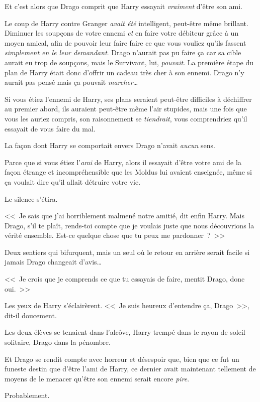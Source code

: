 Et c'est alors que Drago comprit que Harry essayait \emph{vraiment} d'être son ami.

Le coup de Harry contre Granger \emph{avait été} intelligent, peut-être même brillant. Diminuer les soupçons de votre ennemi \emph{et} en faire votre débiteur grâce à un moyen amical, afin de pouvoir leur faire faire ce que vous vouliez qu'ils fassent \emph{simplement en le leur demandant}. Drago n'aurait pas pu faire ça car sa cible aurait eu trop de soupçons, mais le Survivant, lui, \emph{pouvait}. La première étape du plan de Harry était donc d'offrir un cadeau très cher à son ennemi. Drago n'y aurait pas pensé mais ça pouvait \emph{marcher}…

Si vous étiez l'ennemi de Harry, ses plans seraient peut-être difficiles à déchiffrer au premier abord, ils auraient peut-être même l'air stupides, mais une fois que vous les auriez compris, son raisonnement se \emph{tiendrait}, vous comprendriez qu'il essayait de vous faire du mal.

La façon dont Harry se comportait envers Drago n'avait \emph{aucun} sens.

Parce que si vous étiez l'\emph{ami} de Harry, alors il essayait d'être votre ami de la façon étrange et incompréhensible que les Moldus lui avaient enseignée, même si ça voulait dire qu'il allait détruire votre vie.

Le silence s'étira.

<<~Je sais que j'ai horriblement malmené notre amitié, dit enfin Harry. Mais Drago, s'il te plaît, rends-toi compte que je voulais juste que nous découvrions la vérité ensemble. Est-ce quelque chose que tu peux me pardonner~?~>>

Deux sentiers qui bifurquent, mais un seul où le retour en arrière serait facile si jamais Drago changeait d'avis…

<<~Je crois que je comprends ce que tu essayais de faire, mentit Drago, donc oui.~>>

Les yeux de Harry s'éclairèrent. <<~Je suis heureux d'entendre ça, Drago~>>, dit-il doucement.

Les deux élèves se tenaient dans l'alcôve, Harry trempé dans le rayon de soleil solitaire, Drago dans la pénombre.

Et Drago se rendit compte avec horreur et désespoir que, bien que ce fut un funeste destin que d'être l'ami de Harry, ce dernier avait maintenant tellement de moyens de le menacer qu'être son ennemi serait encore \emph{pire}.

Probablement.

